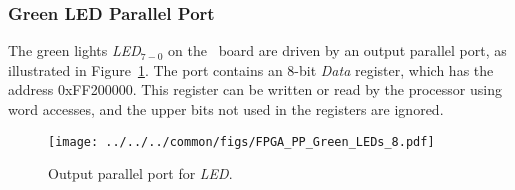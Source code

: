 \subsubsection{Green LED Parallel Port}

The green lights {\it LED}$_{7-0}$ on the \DEBoard~board
are driven by an output parallel port, as illustrated in Figure~\ref{fig:LED_port}. The port
contains an 8-bit {\it Data} register, which has the
address {\sf 0xFF200000}.  This register can be written or read by the processor using word 
accesses, and the upper bits not used in the registers are ignored.

\begin{figure}[h!]
   \begin{center}
       \texttt{[image: ../../../common/figs/FPGA\_PP\_Green\_LEDs\_8.pdf]}
   \end{center}
   \caption{Output parallel port for {\it LED}.}
	\label{fig:LED_port}
\end{figure}